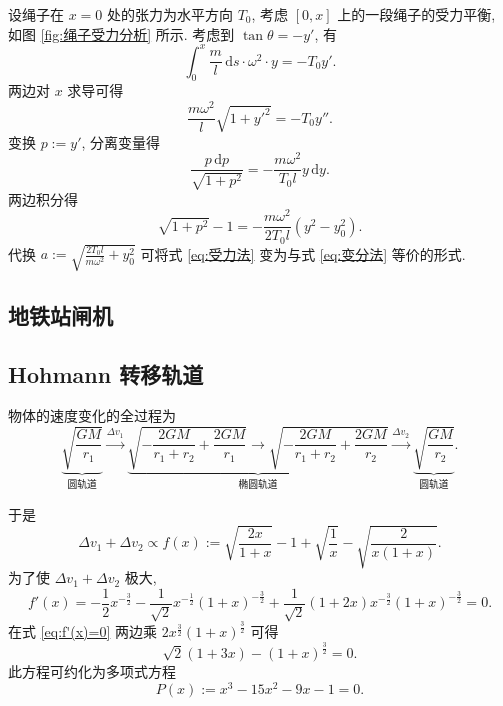 \documentclass{article}
\begin{document}
设绳子在 $x=0$ 处的张力为水平方向 $T_0$,
考虑 $\left[0,x\right]$ 上的一段绳子的受力平衡, 如图 \ref{fig:绳子受力分析} 所示.
考虑到 $\tan\theta=-y'$, 有
\begin{equation}
	\int_0^x\frac ml\,\mathrm ds\cdot\omega^2\cdot y=-T_0y'.
\end{equation}
两边对 $x$ 求导可得
\begin{equation}
	\frac{m\omega^2}{l}\sqrt{1+y'^2}=-T_0y''.
\end{equation}
变换 $p:=y'$, 分离变量得
\begin{equation}
	\frac{p\,\mathrm dp}{\sqrt{1+p^2}}=-\frac{m\omega^2}{T_0l}y\,\mathrm dy.
\end{equation}
两边积分得
\begin{equation}
	\sqrt{1+p^2}-1=-\frac{m\omega^2}{2T_0l}\left(y^2-y_0^2\right).
	\label{eq:受力法}
\end{equation}
代换 $a:=\sqrt{\frac{2T_0l}{m\omega^2}+y_0^2}$ 可将式 \ref{eq:受力法} 变为与式 \ref{eq:变分法} 等价的形式.

\subsection{地铁站闸机}

\subsection{Hohmann 转移轨道}

物体的速度变化的全过程为
\begin{equation}
	\underbrace{\sqrt{\frac{GM}{r_1}}}_{\text{圆轨道}}\xrightarrow{\Delta v_1}
	\underbrace{\sqrt{-\frac{2GM}{r_1+r_2}+\frac{2GM}{r_1}}
	\rightarrow\sqrt{-\frac{2GM}{r_1+r_2}+\frac{2GM}{r_2}}}_{\text{椭圆轨道}}
	\xrightarrow{\Delta v_2}\underbrace{\sqrt{\frac{GM}{r_2}}}_{\text{圆轨道}}.
\end{equation}

于是
\begin{equation}
	\Delta v_1+\Delta v_2\propto f\!\left(x\right):=\sqrt{\frac{2x}{1+x}}-1+\sqrt{\frac1x}-\sqrt{\frac2{x\left(1+x\right)}}.
\end{equation}
为了使 $\Delta v_1+\Delta v_2$ 极大,
\begin{equation}
	f'\!\left(x\right)=-\frac12x^{-\frac32}-\frac1{\sqrt2}x^{-\frac12}\left(1+x\right)^{-\frac32}+\frac1{\sqrt2}\left(1+2x\right)x^{-\frac32}\left(1+x\right)^{-\frac32}=0.
	\label{eq:f'(x)=0}
\end{equation}
在式 \ref{eq:f'(x)=0} 两边乘 $2x^{\frac32}\left(1+x\right)^{\frac32}$ 可得
\begin{equation}
	\sqrt2\left(1+3x\right)-\left(1+x\right)^{\frac32}=0.
\end{equation}
此方程可约化为多项式方程
\begin{equation}
	P\!\left(x\right):=x^3-15x^2-9x-1=0.
\end{equation}
\end{document}
